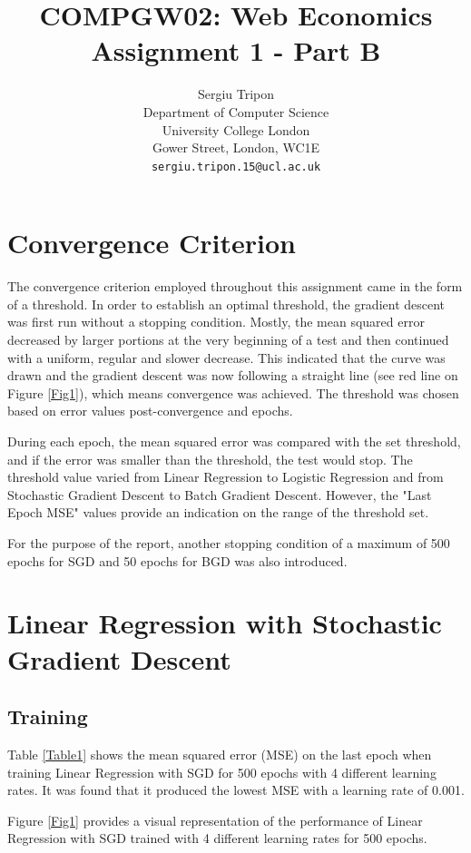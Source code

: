 \documentclass{article} %
\title{COMPGW02: Web Economics\\Assignment 1 - Part B}
\author{
Sergiu Tripon\\
Department of Computer Science\\
University College London\\
Gower Street, London, WC1E\\
\texttt{sergiu.tripon.15@ucl.ac.uk}\\
}
\begin{document}
\maketitle

\section{Convergence Criterion}

The convergence criterion employed throughout this assignment came in the form of a threshold. In order to establish an optimal threshold, the gradient descent was first run without a stopping condition. Mostly, the mean squared error decreased by larger portions at the very beginning of a test and then continued with a uniform, regular and slower decrease. This indicated that the curve was drawn and the gradient descent was now following a straight line (see red line on Figure \ref{Fig1}), which means convergence was achieved. The threshold was chosen based on error values post-convergence and epochs.

During each epoch, the mean squared error was compared with the set threshold, and if the error was smaller than the threshold, the test would stop. The threshold value varied from Linear Regression to Logistic Regression and from Stochastic Gradient Descent to Batch Gradient Descent. However, the "Last Epoch MSE" values provide an indication on the range of the threshold set.

For the purpose of the report, another stopping condition of a maximum of 500 epochs for SGD and 50 epochs for BGD was also introduced. 

\section{Linear Regression with Stochastic Gradient Descent \cite{ng2000cs229} \cite{roc_curve}}

\subsection{Training}

Table \ref{Table1} shows the mean squared error (MSE) on the last epoch when training Linear Regression with SGD for 500 epochs with 4 different learning rates. It was found that it produced the lowest MSE with a learning rate of 0.001.

Figure \ref{Fig1} provides a visual representation of the performance of Linear Regression with SGD trained with 4 different learning rates for 500 epochs.
\end{document}
